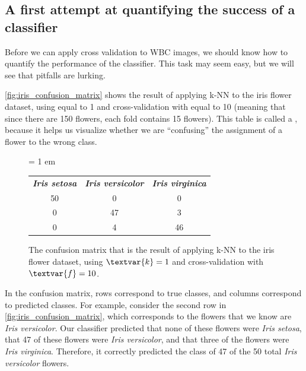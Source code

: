 \FloatBarrier
{}
\subsection{A first attempt at quantifying the success of a classifier}

Before we can apply cross validation to WBC images, we should know how to quantify the performance of the classifier. This task may seem easy, but we will see that pitfalls are lurking.

\autoref{fig:iris_confusion_matrix} shows the result of applying k-NN to the iris flower dataset, using  equal to 1 and cross-validation with  equal to 10 (meaning that since there are 150 flowers, each fold contains 15 flowers). This table is called a , because it helps us visualize whether we are ``confusing'' the assignment of a flower to the wrong class.\\

\begin{figure}[h]
\centering
\tabcolsep = 1 em
\mySfFamily
\begin{tabular}{c c c}
\textbf{\textit{Iris setosa}} & \textbf{\textit{Iris versicolor}} & \textbf{\textit{Iris virginica}} \\
50 & 0 & 0 \\
0 & 47 & 3 \\
0 & 4 & 46
\end{tabular}
\caption{The confusion matrix that is the result of applying k-NN to the iris flower dataset, using $\textvar{k} = \text{1}$ and cross-validation with $\textvar{f} = \text{10}$.}
\label{fig:iris_confusion_matrix}
\end{figure}

In the confusion matrix, rows correspond to true classes, and columns correspond to predicted classes. For example, consider the second row in \autoref{fig:iris_confusion_matrix}, which corresponds to the flowers that we know are \textit{Iris versicolor}. Our classifier predicted that none of these flowers were \textit{Iris setosa}, that 47 of these flowers were \textit{Iris versicolor}, and that three of the flowers were \textit{Iris virginica}. Therefore, it correctly predicted the class of 47 of the 50 total \textit{Iris versicolor} flowers.\\

\begin{note}\end{note}

